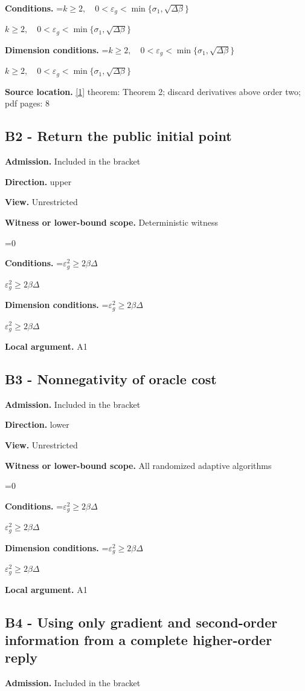 \documentclass[10pt,a4paper]{article}
\newcommand{\AtlasMath}[1]{\par\begingroup\centering\setbox0=\hbox{$\displaystyle #1$}\ifdim\wd0>1.4\linewidth\typeout{ATLAS WIDE FORMULA: \the\wd0}\fi\ifdim\wd0>\linewidth\resizebox{\linewidth}{!}{\box0}\else\box0\fi\par\endgroup}
\newcommand{\AtlasInlineMath}[1]{\begingroup\setbox0=\hbox{$#1$}\ifdim\wd0>.4\linewidth\endgroup\AtlasMath{#1}\else\endgroup$#1$\fi}
\begin{document}
\textbf{Conditions.} \AtlasInlineMath{k\ge2,\quad0<\varepsilon_g<\min\{\sigma_1,\sqrt{\Delta\beta}\}}

\textbf{Dimension conditions.} \AtlasInlineMath{k\ge2,\quad0<\varepsilon_g<\min\{\sigma_1,\sqrt{\Delta\beta}\}}

\textbf{Source location.} \href{https://proceedings.mlr.press/v125/arjevani20a/arjevani20a.pdf}{[1]} theorem: Theorem 2; discard derivatives above order two; pdf pages: 8

\subsection{B2 - Return the public initial point}
\textbf{Admission.} Included in the bracket

\textbf{Direction.} upper

\textbf{View.} Unrestricted

\textbf{Witness or lower-bound scope.} Deterministic witness

\AtlasMath{0}
\textbf{Conditions.} \AtlasInlineMath{\varepsilon_g^2\ge2\beta\Delta}

\textbf{Dimension conditions.} \AtlasInlineMath{\varepsilon_g^2\ge2\beta\Delta}

\textbf{Local argument.} A1

\subsection{B3 - Nonnegativity of oracle cost}
\textbf{Admission.} Included in the bracket

\textbf{Direction.} lower

\textbf{View.} Unrestricted

\textbf{Witness or lower-bound scope.} All randomized adaptive algorithms

\AtlasMath{0}
\textbf{Conditions.} \AtlasInlineMath{\varepsilon_g^2\ge2\beta\Delta}

\textbf{Dimension conditions.} \AtlasInlineMath{\varepsilon_g^2\ge2\beta\Delta}

\textbf{Local argument.} A1

\subsection{B4 - Using only gradient and second-order information from a complete higher-order reply}
\textbf{Admission.} Included in the bracket
\end{document}
